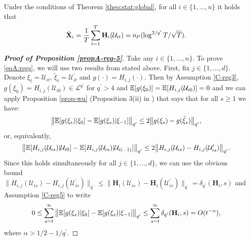 \begin{propA}\label{propA-reg-5}
Under the conditions of Theorem \ref{theo:stat:global}, for all $i \in \{1, \ldots, n\}$ it holds that
{\color{red}\begin{align}\label{eqA:regs}
\bar{\mathbf{X}}_i = \frac{1}{T}\sum_{t=1}^T \mathbf{H}_i (\mathcal{U}_{it}) = o_P(\log^{2/{q^\prime}}{T}/\sqrt{T}).
\end{align}}\end{propA}
\begin{proof}[\textnormal{\textbf{Proof of Proposition \ref{propA-reg-5}}}] 

Take any $i \in \{1, \ldots, n\}$. To prove \eqref{eqA:regs}, we will use two results from \cite*{Wu2007} stated above. First, fix $j \in \{1, \ldots, d\}$. Denote $\xi_t = \mathcal{U}_{it},\, \tilde{\xi}_t = \mathcal{U}^\prime_{it}$ and $g(\cdot) = H_{i,j}(\cdot)$. Then by Assumption \ref{C-reg3}, $g(\xi_0) = H_{i, j}(\mathcal{U}_{i0}) \in \mathcal{L}^{q^\prime}$ for $q^\prime > 4$ and $\mathbb{E}[g(\xi_0)] = \mathbb{E}[H_{i, j}(\mathcal{U}_{i0})] = 0$ and we can apply Proposition \ref{prop-wu} (Proposition 3(ii) in \linebreak \cite{Wu2007}) that says that for all $s \geq 1$ we have:
\begin{align*}
\big\lVert \mathbb{E} [g(\xi_s)| \xi_0] - \mathbb{E} [g(\xi_s)| \xi_{-1}]\big\rVert_{q^\prime} \leq 2 \big\lVert g(\xi_s) - g(\tilde{\xi}_s)\big\rVert_{q^\prime},
\end{align*}
or, equivalently,
\begin{align*}
\big\lVert \mathbb{E} [H_{i, j}(\mathcal{U}_{is})| \mathcal{U}_{i0}] - \mathbb{E} [H_{i, j}(\mathcal{U}_{is})| \mathcal{U}_{i(-1)}]\big\rVert_{q^\prime} \leq 2 \big\lVert H_{i, j}(\mathcal{U}_{is}) - H_{i, j}(\mathcal{U}_{is}^\prime)\big\rVert_{q^\prime}.
\end{align*}
Since this holds simultaneously for all $j \in \{1, \ldots, d\}$, we can use the obvious bound $\big\lVert H_{i, j}(\mathcal{U}_{is}) - H_{i, j}(\mathcal{U}_{is}^\prime)\big\rVert_{q^\prime} \leq \big\lVert \mathbf{H}_{i}(\mathcal{U}_{is}) - \mathbf{H}_{i}(\mathcal{U}_{is}^\prime)\big\rVert_{q^\prime} = \delta_{q^\prime}(\mathbf{H}_i, s)$ and Assumption \ref{C-reg5} to write 
\begin{align*}
0 \leq \sum_{s = t}^\infty\big\lVert \mathbb{E} [g(\xi_s)| \xi_0] - \mathbb{E} [g(\xi_s)| \xi_{-1}]\big\rVert_{q^\prime} \leq \sum_{s = t}^\infty \delta_{q^\prime}(\mathbf{H}_i, s) =O(t^{-\alpha}),
\end{align*}
where $\alpha > 1/2 - 1/{q^\prime}$.


\end{proof}
